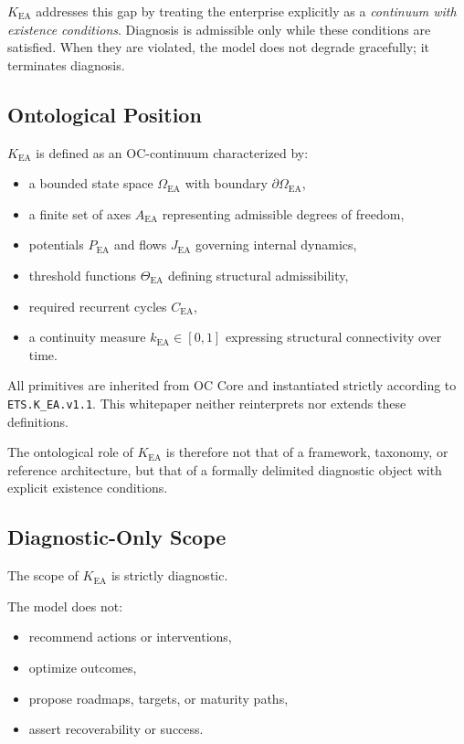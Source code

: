 $K_{\mathrm{EA}}$ addresses this gap by treating the enterprise explicitly
as a \emph{continuum with existence conditions}.
Diagnosis is admissible only while these conditions are satisfied.
When they are violated, the model does not degrade gracefully; it
terminates diagnosis.

\subsection*{Ontological Position}

$K_{\mathrm{EA}}$ is defined as an OC-continuum characterized by:

\begin{itemize}
  \item a bounded state space $\Omega_{\mathrm{EA}}$ with boundary
        $\partial\Omega_{\mathrm{EA}}$,
  \item a finite set of axes $A_{\mathrm{EA}}$ representing admissible
        degrees of freedom,
  \item potentials $P_{\mathrm{EA}}$ and flows $J_{\mathrm{EA}}$
        governing internal dynamics,
  \item threshold functions $\Theta_{\mathrm{EA}}$ defining structural
        admissibility,
  \item required recurrent cycles $C_{\mathrm{EA}}$,
  \item a continuity measure $k_{\mathrm{EA}} \in [0,1]$ expressing
        structural connectivity over time.
\end{itemize}

All primitives are inherited from OC Core and instantiated strictly
according to \texttt{ETS.K\_EA.v1.1}.
This whitepaper neither reinterprets nor extends these definitions.

The ontological role of $K_{\mathrm{EA}}$ is therefore not that of a
framework, taxonomy, or reference architecture, but that of a formally
delimited diagnostic object with explicit existence conditions.

\subsection*{Diagnostic-Only Scope}

The scope of $K_{\mathrm{EA}}$ is strictly diagnostic.

The model does not:
\begin{itemize}
  \item recommend actions or interventions,
  \item optimize outcomes,
  \item propose roadmaps, targets, or maturity paths,
  \item assert recoverability or success.
\end{itemize}

